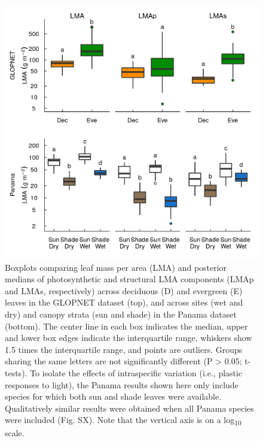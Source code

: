 \documentclass[
  12pt,
  a4paper,
,tablecaptionabove
]{scrartcl}
\begin{document}
\newpage

\begin{figure}
\hypertarget{fig:boxplt}{%
\centering
\includegraphics{../figs/box_main.png}
\caption{Boxplots comparing leaf mass per area (LMA) and posterior medians of photosynthetic and structural LMA components (LMAp and LMAs, respectively) across deciduous (D) and evergreen (E) leaves in the GLOPNET dataset (top), and across sites (wet and dry) and canopy strata (sun and shade) in the Panama dataset (bottom).
The center line in each box indicates the median, upper and lower box edges indicate the interquartile range, whiskers show 1.5 times the interquartile range, and points are outliers.
Groups sharing the same letters are not significantly different (P \textgreater{} 0.05; t-tests).
To isolate the effects of intraspecific variation (i.e., plastic responses to light), the Panama results shown here only include species for which both sun and shade leaves were available.
Qualitatively similar results were obtained when all Panama species were included (Fig. SX).
Note that the vertical axis is on a log\textsubscript{10} scale.}\label{fig:boxplt}
}
\end{figure}

\newpage
\end{document}
